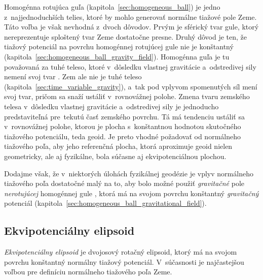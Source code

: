 \documentclass[a4paper, 12pt]{book}
\begin{document}
Homogénna rotujúca guľa (kapitola~\ref{sec:homogeneous_ball}) je jedno 
z~najjednoduchších telies, ktoré by mohlo generovať normálne tiažové pole Zeme.  
Táto voľba je však nevhodná z~dvoch dôvodov.  Prvým je sférický tvar gule, 
ktorý nereprezentuje sploštený tvar Zeme dostatočne presne.  Druhý dôvod je 
ten, že tiažový potenciál na povrchu homogénnej rotujúcej gule nie je 
konštantný (kapitola~\ref{sec:homogeneous_ball_gravity_field}).  Homogénna guľa 
je tu považovaná za tuhé teleso, ktoré v~dôsledku vlastnej gravitácie 
a~odstredivej sily nemení svoj tvar \parencite{SansoGeoidDetermination}.  Zem 
ale nie je tuhé teleso (kapitola~\ref{sec:time_variable_gravity}), a~tak pod 
vplyvom spomenutých síl mení svoj tvar, pričom sa snaží ustáliť v~rovnovážnej 
polohe.  Zmena tvaru zemského telesa v~dôsledku vlastnej gravitácie 
a~odstredivej sily je jednoducho predstaviteľná pre~tekutú časť zemského 
povrchu.  Tá má tendenciu ustáliť sa v~rovnovážnej polohe, ktorou je plocha 
s~konštantnou hodnotou skutočného tiažového potenciálu, teda geoid.  Je preto 
vhodné požadovať od normálneho tiažového poľa, aby jeho referenčná plocha, 
ktorá aproximuje geoid nielen geometricky, ale aj fyzikálne, bola súčasne aj 
ekvipotenciálnou plochou.

Dodajme však, že v~niektorých úlohách fyzikálnej geodézie je vplyv normálneho 
tiažového poľa dostatočné malý na to, aby bolo možné použiť \emph{gravitačné} 
pole \emph{nerotujúcej} homogénnej gule \parencite{SansoGeoidDetermination}, 
ktorá má na svojom povrchu konštantný \emph{gravitačný} potenciál 
(kapitola~\ref{sec:homogeneous_ball_gravitational_field}).

\subsection{Ekvipotenciálny elipsoid}
\label{sec:normal_field_equipotential_ellipsoid}

\emph{Ekvipotenciálny elipsoid} je dvojosový rotačný elipsoid, ktorý má na 
svojom povrchu konštantný normálny tiažový potenciál.  V~súčasnosti je 
najčastejšou voľbou pre definíciu normálneho tiažového poľa Zeme.
\end{document}
